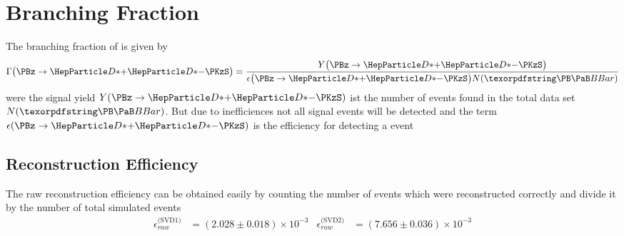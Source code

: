 \documentclass[a4paper]{report}
\def\RawReconstructionEffSVDOne{(2.028 \pm 0.018) \times 10^{-3}}
\def\RawReconstructionEffSVDTwo{(7.656 \pm 0.036) \times 10^{-3}}
\begin{document}
\chapter{Branching Fraction}
The branching fraction of \ddk is given by
\begin{equation}
    \BR\big(\ddk\big) = \frac{Y\big(\ddk\big)}{\epsilon\big(\ddk\big)
    N(\bbar)}
    \label{eq:branching_fraction}
\end{equation}
were the signal yield $Y(\ddk)$ ist the number of \ddk events found in the total
data set $N(\bbar)$. But due to inefficiences not all
signal events will be detected and the term $\epsilon(\ddk)$ is the efficiency
for detecting a \ddk event

\section{Reconstruction Efficiency}

The raw reconstruction efficiency can be obtained easily by counting the number
of events which were reconstructed correctly and divide it by the number of
total simulated events
\begin{align}
    \epsilon_{raw}^{\text{(SVD1)}} & = \RawReconstructionEffSVDOne &
    \epsilon_{raw}^{\text{(SVD2)}} & = \RawReconstructionEffSVDTwo
\end{align}
\end{document}

